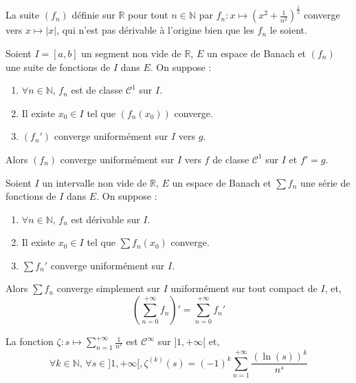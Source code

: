 	\begin{cexample}
		La suite $(f_n)$ définie sur $\mathbb{R}$ pour tout $n \in \mathbb{N}$ par $f_n : x \mapsto \left( x^2 + \frac{1}{n^2} \right)^{\frac{1}{2}}$ converge vers $x \mapsto \vert x \vert$, qui n'est pas dérivable à l'origine bien que les $f_n$ le soient.
	\end{cexample}
	
	
	\begin{theorem}
		Soient $I = [a,b]$ un segment non vide de $\mathbb{R}$, $E$ un espace de Banach et $(f_n)$ une suite de fonctions de $I$ dans $E$. On suppose :
		\begin{enumerate}[label=(\roman*)]
			\item $\forall n \in \mathbb{N}, \, f_n$ est de classe $\mathcal{C}^1$ sur $I$.
			\item Il existe $x_0 \in I$ tel que $(f_n(x_0))$ converge.
			\item $(f_n')$ converge uniformément sur $I$ vers $g$.
		\end{enumerate}
		Alors $(f_n)$ converge uniformément sur $I$ vers $f$ de classe $\mathcal{C}^1$ sur $I$ et $f' = g$.
	\end{theorem}
	
	\begin{theorem}
		Soient $I$ un intervalle non vide de $\mathbb{R}$, $E$ un espace de Banach et $\sum f_n$ une série de fonctions de $I$ dans $E$. On suppose :
		\begin{enumerate}[label=(\roman*)]
			\item $\forall n \in \mathbb{N}, \, f_n$ est dérivable sur $I$.
			\item Il existe $x_0 \in I$ tel que $\sum f_n(x_0)$ converge.
			\item $\sum f_n'$ converge uniformément sur $I$.
		\end{enumerate}
		Alors $\sum f_n$ converge simplement sur $I$ uniformément sur tout compact de $I$, et,
		\[ \left( \sum_{n=0}^{+\infty} f_n \right)' = \sum_{n=0}^{+\infty} f_n' \]
	\end{theorem}
	
	\begin{example}
		La fonction $\zeta : s \mapsto \sum_{n=1}^{+\infty} \frac{1}{n^s}$ est $\mathcal{C}^\infty$ sur $]1, +\infty[$ et,
		\[ \forall k \in \mathbb{N}, \, \forall s \in ]1, +\infty[, \zeta^{(k)}(s) = (-1)^k \sum_{n=1}^{+\infty} \frac{(\ln(s))^k}{n^s} \]
	\end{example}
	
